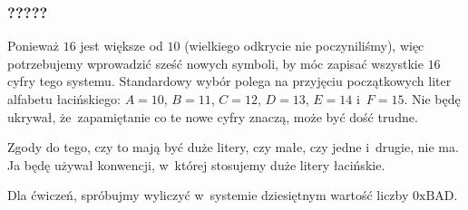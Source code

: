 \documentclass[10pt,t]{beamer}
\begin{document}
\begin{frame}
  \frametitle{?????}


  Ponieważ $16$ jest większe od $10$ (wielkiego odkrycie nie poczyniliśmy),
  więc potrzebujemy wprowadzić sześć nowych symboli, by móc zapisać
  wszystkie $16$ cyfry tego systemu. Standardowy wybór polega na przyjęciu
  początkowych liter alfabetu łacińskiego: $A = 10$, $B = 11$,
  $C = 12$, $D = 13$, $E = 14$ i~$F = 15$. Nie będę ukrywał,
  że~zapamiętanie co te nowe cyfry znaczą, może być dość trudne.

  Zgody do tego, czy to mają być duże litery, czy małe, czy jedne i~drugie,
  nie ma. Ja będę używał konwencji, w~której stosujemy duże litery
  łacińskie.

  Dla ćwiczeń, spróbujmy wyliczyć w~systemie dziesiętnym wartość liczby
  $0\text{xBAD}$.

\end{frame}
















\end{document}
